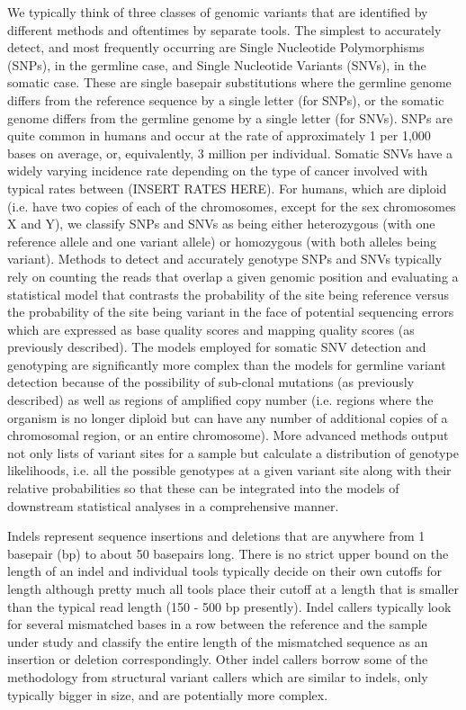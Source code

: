 We typically think of three classes of genomic variants that are identified by different methods and oftentimes by separate tools. The simplest to accurately detect, and most frequently occurring are Single Nucleotide Polymorphisms (SNPs), in the germline case, and Single Nucleotide Variants (SNVs), in the somatic case. These are single basepair substitutions where the germline genome differs from the reference sequence by a single letter (for SNPs), or the somatic genome differs from the germline genome by a single letter (for SNVs). SNPs are quite common in humans and occur at the rate of approximately 1 per 1,000 bases on average, or, equivalently, 3 million per individual. Somatic SNVs have a widely varying incidence rate depending on the type of cancer involved with typical rates between (INSERT RATES HERE). For humans, which are diploid (i.e. have two copies of each of the chromosomes, except for the sex chromosomes X and Y), we classify SNPs and SNVs as being either heterozygous (with one reference allele and one variant allele) or homozygous (with both alleles being variant). Methods to detect and accurately genotype SNPs and SNVs typically rely on counting the reads that overlap a given genomic position and evaluating a statistical model that contrasts the probability of the site being reference versus the probability of the site being variant in the face of potential sequencing errors which are expressed as base quality scores and mapping quality scores (as previously described). The models employed for somatic SNV detection and genotyping are significantly more complex than the models for germline variant detection because of the possibility of sub-clonal mutations (as previously described) as well as regions of amplified copy number (i.e. regions where the organism is no longer diploid but can have any number of additional copies of a chromosomal region, or an entire chromosome). More advanced methods output not only lists of variant sites for a sample but calculate a distribution of genotype likelihoods, i.e. all the possible genotypes at a given variant site along with their relative probabilities so that these can be integrated into the models of downstream statistical analyses in a comprehensive manner.

Indels represent sequence insertions and deletions that are anywhere from 1 basepair (bp) to about 50 basepairs long. There is no strict upper bound on the length of an indel and individual tools typically decide on their own cutoffs for length although pretty much all tools place their cutoff at a length that is smaller than the typical read length (150 - 500 bp presently). Indel callers typically look for several mismatched bases in a row between the reference and the sample under study and classify the entire length of the mismatched sequence as an insertion or deletion correspondingly. Other indel callers borrow some of the methodology from structural variant callers which are similar to indels, only typically bigger in size, and are potentially more complex.

